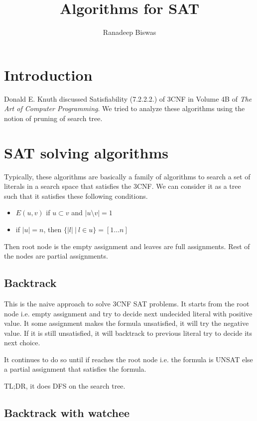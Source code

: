 \documentclass[a4paper]{article}
\title{Algorithms for SAT}
\author{Ranadeep Biswas}
\date{}
\begin{document}
\maketitle

\section{Introduction}
Donald E. Knuth discussed Satisfiability (7.2.2.2.) of 3CNF in Volume 4B of \emph{The Art of Computer Programming}. We tried to analyze these algorithms using the notion of pruning of search tree.

\section{SAT solving algorithms}

Typically, these algorithms are basically a family of algorithms to search a set of literals in a search space that satisfies the 3CNF. We can consider it as a tree such that it satisfies these following conditions.

\begin{itemize}
\item $E(u, v)$ if $u \subset v$ and $|u \setminus v| = 1$
\item if $|u| = n$, then $\{|l|\ |\ l \in u\} = [1\ldots n]$
\end{itemize}

Then root node is the empty assignment and leaves are full assignments. Rest of the nodes are partial assignments.

\subsection{Backtrack}

This is the naive approach to solve 3CNF SAT problems. It starts from the root node i.e. empty assignment and try to decide next undecided literal with positive value. It some assignment makes the formula unsatisfied, it will try the negative value. If it is still unsatisfied, it will backtrack to previous literal try to decide its next choice.

It continues to do so until if reaches the root node i.e. the formula is UNSAT else a partial assignment that satisfies the formula.

TL;DR, it does DFS on the search tree.

\subsection{Backtrack with watchee}
\end{document}
